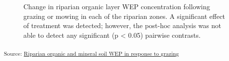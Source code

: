 \documentclass[
]{agujournal2019}
\begin{document}
\begin{figure}[H]


\caption{\label{fig-organic-wep}Change in riparian organic layer WEP
concentration following grazing or mowing in each of the riparian zones.
A significant effect of treatment was detected; however, the post-hoc
analysis was not able to detect any significant (p \textless{} 0.05)
pairwise contrasts.}

\end{figure}%

\textsubscript{Source:
\href{https://alex-koiter.github.io/riparian-grazing-manuscript/notebooks/03_Soils_analysis-preview.html\#cell-fig-organic-WEP}{Riparian
organic and mineral soil WEP in response to grazing}}
\end{document}
